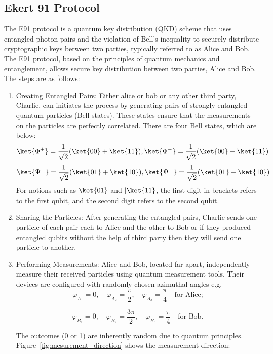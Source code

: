 \documentclass[a4paper]{cas-sc}
\begin{document}
\subsection{Ekert 91 Protocol}
\label{sec:e91}
The E91 protocol is a quantum key distribution (QKD) scheme that uses entangled photon pairs and the violation of Bell's inequality to securely distribute cryptographic keys between two parties, typically referred to as Alice and Bob. The E91 protocol, based on the principles of quantum mechanics and entanglement, allows secure key distribution between two parties, Alice and Bob. The steps are as follows:
\begin{enumerate}
    \item Creating Entangled Pairs: Either alice or bob or any other third party, Charlie, can initiates the process by generating pairs of strongly entangled quantum particles (Bell states). These states ensure that the measurements on the particles are perfectly correlated. There are four Bell states, which are below:
          \[\ket{\Phi^{+}}=\frac{1}{\sqrt{2}}(\ket{00}+\ket{11}),\ket{\Phi^{-}}=\frac{1}{\sqrt{2}}(\ket{00}-\ket{11})\]
          \[\ket{\Psi^{+}}=\frac{1}{\sqrt{2}}(\ket{01}+\ket{10}),\ket{\Psi^{-}}=\frac{1}{\sqrt{2}}(\ket{01}-\ket{10})\]
          For notions such as $\ket{01}$ and $|\ket{11}$, the first digit in brackets refers to the first qubit, and the second digit refers to the second qubit.

    \item Sharing the Particles: After generating the entangled pairs, Charlie sends one particle of each pair each to Alice and the other to Bob or if they produced entangled qubits without the help of third party then they will send one particle to another.
    \item Performing Measurements: Alice and Bob, located far apart, independently measure their received particles using quantum measurement tools. Their devices are configured with randomly chosen azimuthal angles e.g.  \[
              \varphi_{A_1} = 0, \quad \varphi_{A_2} = \frac{\pi}{2}, \quad \varphi_{A_3} = \frac{\pi}{4} \quad \text{for Alice;}
          \]

          \[
              \varphi_{B_1} = 0, \quad \varphi_{B_2} = \frac{3\pi}{2}, \quad \varphi_{B_3} = \frac{\pi}{4} \quad \text{for Bob.}
          \]

          The outcomes (0 or 1) are inherently random due to quantum principles.
          Figure~\ref{fig:mesurement_direction} shows the measurement direction:


\end{enumerate}
\end{document}
